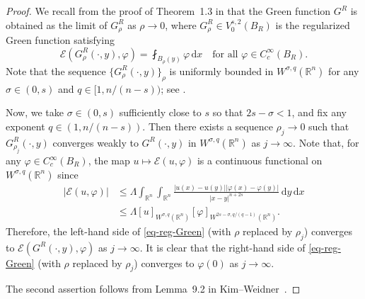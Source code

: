 \documentclass[11pt]{amsart}
\theoremstyle{plain}
\theoremstyle{definition}
\numberwithin{equation}{section}
\begin{document}
\begin{proof}
We recall from the proof of Theorem~1.3 in \cite{KKL23} that the Green function $G^R$ is obtained as the limit of $G_\rho^R$ as $\rho \to 0$, where $G_\rho^R \in V^{s, 2}_0(B_R)$ is the regularized Green function satisfying
\begin{equation}\label{eq-reg-Green}
\mathcal{E}(G_\rho^R(\cdot, y), \varphi)=\fint_{B_\rho(y)} \varphi \,\mathrm{d}x \quad\text{for all }\varphi \in C^\infty_c(B_R).
\end{equation}
Note that the sequence $\{G_\rho^R(\cdot, y)\}_\rho$ is uniformly bounded in $W^{\sigma, q}(\mathbb{R}^n)$ for any $\sigma \in (0,s)$ and $q \in [1, n/(n-s))$; see \cite[p.~16973]{KKL23}.

Now, we take $\sigma \in (0, s)$ sufficiently close to $s$ so that $2s-\sigma<1$, and fix any exponent $q \in (1, n/(n-s))$. Then there exists a sequence $\rho_j \to 0$ such that $G_{\rho_j}^R(\cdot, y)$ converges weakly to $G^R(\cdot, y)$ in $W^{\sigma, q}(\mathbb{R}^n)$ as $j \to \infty$. Note that, for any $\varphi \in C^\infty_c(B_R)$, the map $u \mapsto \mathcal{E}(u, \varphi)$ is a continuous functional on $W^{\sigma, q}(\mathbb{R}^n)$ since
\begin{align*}
|\mathcal{E}(u, \varphi)|
&\leq \Lambda \int_{\mathbb{R}^n} \int_{\mathbb{R}^n} \frac{|u(x)-u(y)||\varphi(x)-\varphi(y)|}{|x-y|^{n+2s}} \,\mathrm{d}y \,\mathrm{d}x \\
&\leq \Lambda [u]_{W^{\sigma, q}(\mathbb{R}^n)} [\varphi]_{W^{2s-\sigma, q/(q-1)}(\mathbb{R}^n)}.
\end{align*}
Therefore, the left-hand side of \eqref{eq-reg-Green} (with $\rho$ replaced by $\rho_j$) converges to $\mathcal{E}(G^R(\cdot, y), \varphi)$ as $j \to \infty$. It is clear that the right-hand side of \eqref{eq-reg-Green} (with $\rho$ replaced by $\rho_j$) converges to $\varphi(0)$ as $j \to \infty$.

The second assertion follows from Lemma~9.2 in Kim--Weidner~\cite{KW24a}.
\end{proof}
\end{document}
